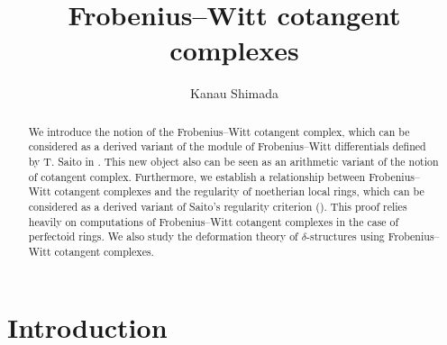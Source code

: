 \documentclass[11pt, a4paper]{amsart}
\title{Frobenius--Witt cotangent complexes}
\author{Kanau Shimada}
\date{}
\theoremstyle{plain}
\theoremstyle{definition}
\begin{document}
\maketitle
\begin{abstract}
    We introduce the notion of the Frobenius--Witt cotangent complex, which can be considered as a derived variant of the module of Frobenius--Witt differentials defined by T. Saito in \cite{Sai22}. This new object also can be seen as an arithmetic variant of the notion of cotangent complex. Furthermore, we establish a relationship between Frobenius--Witt cotangent complexes and the regularity of noetherian local rings, which can be considered as a derived variant of Saito's regularity criterion (\cite[Theorem 3.4]{Sai22}). This proof relies heavily on computations of Frobenius--Witt cotangent complexes in the case of perfectoid rings. We also study the deformation theory of $\delta$-structures using Frobenius--Witt cotangent complexes.
\end{abstract}


\tableofcontents

\section{Introduction}




\end{document}
